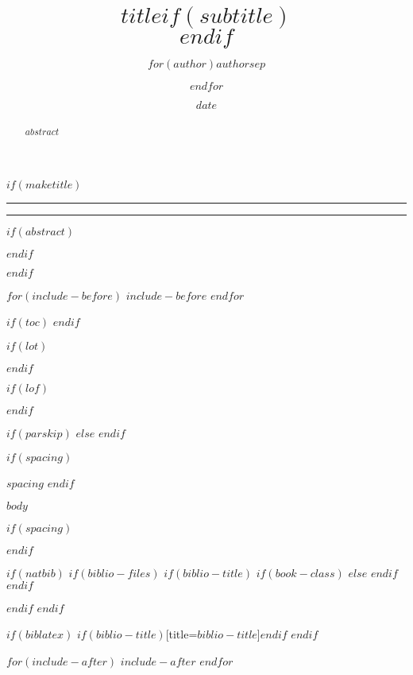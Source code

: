 \documentclass[$if(fontsize)$$fontsize$,$endif$$if(lang)$$lang$,$endif$$if(papersize)$$papersize$,$endif$$for(classoption)$$classoption$$sep$,$endfor$]{$documentclass$}
\title{$title$$if(subtitle)$\\\vspace{0.5em}{\large $subtitle$}$endif$}
\author{$for(author)$$author$$sep$ \and $endfor$}
\date{$date$}
\begin{document}
$if(maketitle)$

\thispagestyle{empty}

\noindent\rule{\textwidth}{2pt}

{\let\newpage\relax\maketitle}

\noindent\rule{\textwidth}{2pt}

\vspace{0.6cm}

$if(abstract)$
\begin{abstract}
\noindent $abstract$
\end{abstract}
$endif$

$endif$ %

$for(include-before)$
$include-before$
$endfor$

$if(toc)$
\tableofcontents
\clearpage
$endif$

\pagestyle{mainstyle}

$if(lot)$
\listoftables
\clearpage
$endif$

$if(lof)$
\listoffigures
\clearpage
$endif$

$if(parskip)$
\setlength{\parskip}{$parskip$}
$else$
\setlength{\parskip}{11pt}
$endif$

$if(spacing)$
\begin{spacing}{$spacing$}
$endif$

$body$

$if(spacing)$
\end{spacing}
$endif$

$if(natbib)$
$if(biblio-files)$
$if(biblio-title)$
$if(book-class)$
\renewcommand\bibname{$biblio-title$}
$else$
\renewcommand\refname{$biblio-title$}
$endif$
$endif$

$endif$
$endif$

$if(biblatex)$
\printbibliography$if(biblio-title)$[title=$biblio-title$]$endif$
$endif$

$for(include-after)$
$include-after$
$endfor$
\end{document}
